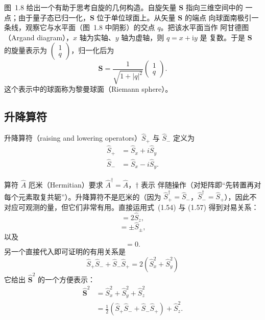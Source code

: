 图~1.8 给出一个有助于思考自旋的几何构造。自旋矢量 $\mathbf{S}$ 指向三维空间中的
一点；由于量子态已归一化，$\mathbf{S}$ 位于单位球面上。从矢量 $\mathbf{S}$ 的端点
向球面南极引一条线，观察它与水平面（图~1.8 中阴影）的交点 $q$。把该水平面当作
阿甘德图（Argand diagram），$x$ 轴为实轴、$y$ 轴为虚轴，则 $q=x+\mathrm{i}y$ 是
复数。于是 $\mathbf{S}$ 的旋量表示为 $\begin{pmatrix}1\\q\end{pmatrix}$，归一化后为
\begin{equation*}
\mathbf{S} = \frac{1}{\sqrt{1+|q|^{2}}}\begin{pmatrix}1\\q\end{pmatrix}.\tag{1.56}
\end{equation*}
这个表示中的球面称为黎曼球面（Riemann sphere）。

\subsection{升降算符}

升降算符（raising and lowering operators）$\hat{S}_{+}$ 与 $\hat{S}_{-}$ 定义为
\begin{equation*}
\begin{aligned}
\hat{S}_{+} &= \hat{S}_x + i\hat{S}_y\\
\hat{S}_{-} &= \hat{S}_x - i\hat{S}_y.
\end{aligned}\tag{1.57}
\end{equation*}

算符 $\hat{A}$ 厄米（Hermitian）要求 $\hat{A}^{\dagger}=\hat{A}$，$\dagger$ 表示
伴随操作（对矩阵即“先转置再对每个元素取复共轭”）。升降算符不是厄米的（因为
$\hat{S}_{+}^{\dagger}=\hat{S}_{-}$，$\hat{S}_{-}^{\dagger}=\hat{S}_{+}$），因此不
对应可观测的量，但它们非常有用。直接运用式~(1.54) 与 (1.57) 得到对易关系：
\begin{equation*}
[\hat{S}_{+}, \hat{S}_{-}] = 2\hat{S}_z,\tag{1.58}
\end{equation*}
\begin{equation*}
[\hat{S}_z, \hat{S}_{\pm}] = \pm\hat{S}_{\pm},\tag{1.59}
\end{equation*}
以及
\begin{equation*}
[\hat{\mathbf{S}}^{2}, \hat{\mathbf{S}}_{\pm}] = 0.\tag{1.60}
\end{equation*}
另一个直接代入即可证明的有用关系是
\begin{equation*}
\hat{S}_{+}\hat{S}_{-} + \hat{S}_{-}\hat{S}_{+} = 2(\hat{S}_x^{2}+\hat{S}_y^{2})\tag{1.61}
\end{equation*}
它给出 $\hat{\mathbf{S}}^{2}$ 的一个方便表示：
\begin{align*}
\hat{\mathbf{S}}^{2} &= \hat{S}_x^{2}+\hat{S}_y^{2}+\hat{S}_z^{2}\tag{1.62}\\
&= \frac{1}{2}\left(\hat{S}_{+}\hat{S}_{-}+\hat{S}_{-}\hat{S}_{+}\right)+\hat{S}_z^{2}.\tag{1.63}
\end{align*}

